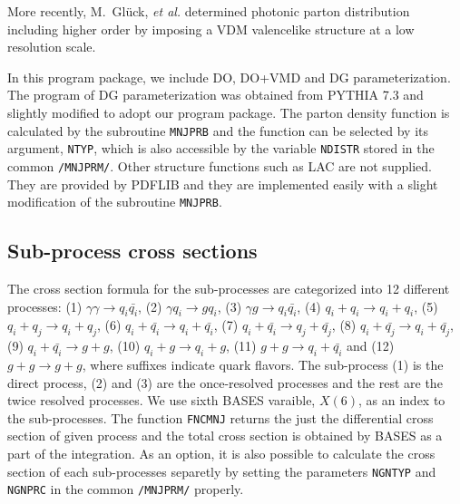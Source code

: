More recently, M.~Gl\"{u}ck, {\it et al.} determined photonic parton
distribution including higher order  by imposing a VDM valencelike
structure at a low resolution scale\cite{GRV92}.  


In this program package, we include 
DO, DO+VMD and  DG parameterization.
The program of DG parameterization was obtained from 
PYTHIA 7.3 and slightly modified to adopt our program package.
The parton density function is calculated by the subroutine
{\tt MNJPRB} and the function can be selected by its argument,
{\tt NTYP}, which is also accessible by the variable 
{\tt NDISTR} stored in the common
{\tt /MNJPRM/}.  
Other structure functions such as 
LAC are not supplied.
They are provided by PDFLIB\cite{PDFLIB}
and they are implemented easily with 
a slight modification of the subroutine {\tt MNJPRB}.


\subsection{Sub-process cross sections}
\label{SECSUBPROCESS}
The cross section formula for the
sub-processes are categorized into 12 different processes:
(1) $\gamma\gamma\rightarrow q_i \bar{q_i}$,
(2) $\gamma q_i \rightarrow g q_i$,
(3) $\gamma g \rightarrow q_i \bar{q_i}$,
(4) $q_i + q_i \rightarrow q_i + q_i$,
(5) $q_i + q_j \rightarrow q_i + q_j$,
(6) $q_i + \bar{q_i} \rightarrow q_i + \bar{q_i}$,
(7) $q_i + \bar{q_i} \rightarrow q_j + \bar{q_j}$,
(8) $q_i + \bar{q_j} \rightarrow q_i + \bar{q_j}$,
(9) $q_i + \bar{q_i} \rightarrow g + g$,
(10) $q_i + g \rightarrow q_i + g$,
(11) $g + g \rightarrow q_i + \bar{q_i}$
and
(12) $g + g \rightarrow g + g $,
where suffixes indicate quark flavors.
The sub-process (1) is the direct process,
(2) and (3) are the once-resolved processes
and the rest are the twice resolved processes.
We use sixth BASES varaible, $X(6)$, as an index
to the sub-processes. The function {\tt FNCMNJ}
returns the just the differential cross section of given 
process and the total cross section is obtained by BASES
as a part of the integration.
As an option, it is also possible to calculate the cross section of each
sub-processes separetly by setting the parameters {\tt NGNTYP} and {\tt NGNPRC}
in the common {\tt /MNJPRM/} properly.

